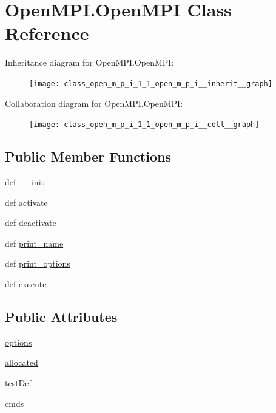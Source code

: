 \hypertarget{class_open_m_p_i_1_1_open_m_p_i}{\section{Open\-M\-P\-I.\-Open\-M\-P\-I Class Reference}
\label{class_open_m_p_i_1_1_open_m_p_i}
}


Inheritance diagram for Open\-M\-P\-I.\-Open\-M\-P\-I\-:
\nopagebreak
\begin{figure}[H]
\begin{center}
\leavevmode
\texttt{[image: class\_open\_m\_p\_i\_1\_1\_open\_m\_p\_i\_\_inherit\_\_graph]}
\end{center}
\end{figure}


Collaboration diagram for Open\-M\-P\-I.\-Open\-M\-P\-I\-:
\nopagebreak
\begin{figure}[H]
\begin{center}
\leavevmode
\texttt{[image: class\_open\_m\_p\_i\_1\_1\_open\_m\_p\_i\_\_coll\_\_graph]}
\end{center}
\end{figure}
\subsection*{Public Member Functions}
\begin{DoxyCompactItemize}
\item 
def \hyperlink{class_open_m_p_i_1_1_open_m_p_i_a98c85be81f92e692e8087d08c45ebd09}{\-\_\-\-\_\-init\-\_\-\-\_\-}
\item 
def \hyperlink{class_open_m_p_i_1_1_open_m_p_i_a446b9a62139dfc9065f4cc21450ed7f9}{activate}
\item 
def \hyperlink{class_open_m_p_i_1_1_open_m_p_i_ae235afe3cd4dfc210b7e8d045a108e5b}{deactivate}
\item 
def \hyperlink{class_open_m_p_i_1_1_open_m_p_i_a3b39e0c05069fd14533b0a528ac58001}{print\-\_\-name}
\item 
def \hyperlink{class_open_m_p_i_1_1_open_m_p_i_a6a912a2ac2d80ba6ac2d6595aa661268}{print\-\_\-options}
\item 
def \hyperlink{class_open_m_p_i_1_1_open_m_p_i_a4339bc2f6d52dce9bdd0818e7ce686d2}{execute}
\end{DoxyCompactItemize}
\subsection*{Public Attributes}
\begin{DoxyCompactItemize}
\item 
\hyperlink{class_open_m_p_i_1_1_open_m_p_i_a4a263774614f0b83a63a26639b46b2f5}{options}
\item 
\hyperlink{class_open_m_p_i_1_1_open_m_p_i_a9ffab4795264fde34d136269026204db}{allocated}
\item 
\hyperlink{class_open_m_p_i_1_1_open_m_p_i_acd20b78013350c2363484589ef85b67c}{test\-Def}
\item 
\hyperlink{class_open_m_p_i_1_1_open_m_p_i_a86be93bbc775c81263813274a8564efc}{cmds}
\end{DoxyCompactItemize}


